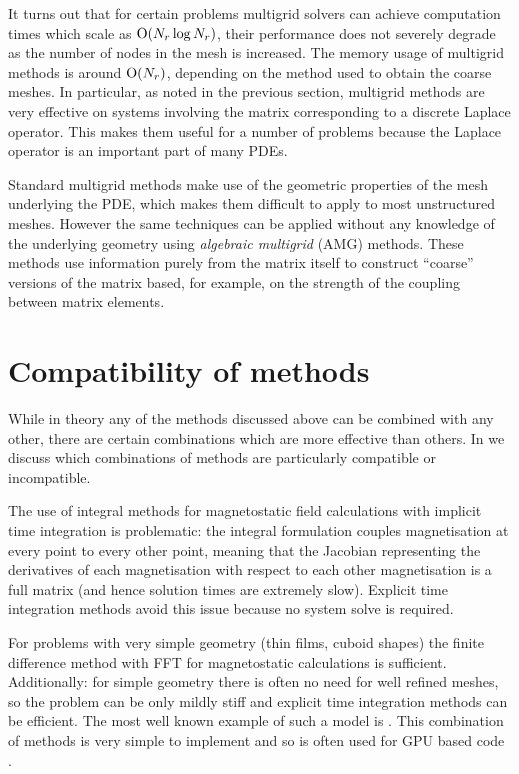 It turns out that for certain problems multigrid solvers can achieve computation times which scale as $\mathrm{O}{\left( N_r \log N_r \right)}$, \ie their performance does not severely degrade as the number of nodes in the mesh is increased.
The memory usage of multigrid methods is around $\mathrm{O}{\left( N_r \right)}$, depending on the method used to obtain the coarse meshes.
In particular, as noted in the previous section, multigrid methods are very effective on systems involving the matrix corresponding to a discrete Laplace operator.
This makes them useful for a number of problems because the Laplace operator is an important part of many PDEs.

Standard multigrid methods make use of the geometric properties of the mesh underlying the PDE, which makes them difficult to apply to most unstructured meshes.
However the same techniques can be applied without any knowledge of the underlying geometry using \emph{algebraic multigrid} (AMG) methods.
These methods use information purely from the matrix itself to construct ``coarse'' versions of the matrix based, for example, on the strength of the coupling between matrix elements.



\section{Compatibility of methods}
\label{sec:comp-meth}

While in theory any of the methods discussed above can be combined with any other, there are certain combinations which are more effective than others.
In  we discuss which combinations of methods are particularly compatible or incompatible.

The use of integral methods for magnetostatic field calculations with implicit time integration is problematic: the integral formulation couples magnetisation at every point to every other point, meaning that the Jacobian representing the derivatives of each magnetisation with respect to each other magnetisation is a full matrix (and hence solution times are extremely slow).
Explicit time integration methods avoid this issue because no system solve is required.

For problems with very simple geometry (\ie thin films, cuboid shapes) the finite difference method with FFT for magnetostatic calculations is sufficient.
Additionally: for simple geometry there is often no need for well refined meshes, so the problem can be only mildly stiff and explicit time integration methods can be efficient.
The most well known example of such a model is \oommf \cite{oommf-website}.
This combination of methods is very simple to implement and so is often used for GPU based code \cite{Vansteenkiste2011}.

